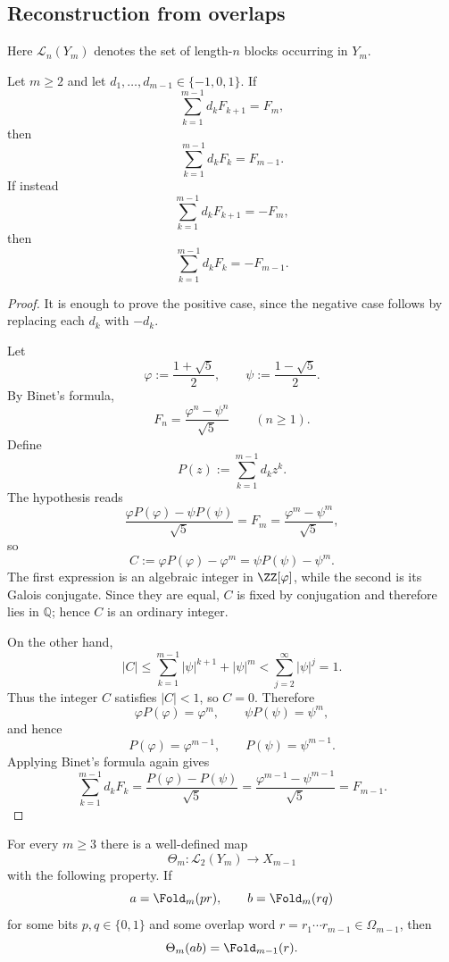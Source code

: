 \subsection{Reconstruction from overlaps}

Here $\mathcal L_n(Y_m)$ denotes the set of length-$n$ blocks occurring in
$Y_m$.

\begin{lemma}
\label{lem:signed-fibonacci-gap-shift}
Let $m\ge 2$ and let $d_1,\ldots,d_{m-1}\in\{-1,0,1\}$.  If
\[
\sum_{k=1}^{m-1} d_kF_{k+1}=F_m,
\]
then
\[
\sum_{k=1}^{m-1} d_kF_k=F_{m-1}.
\]
If instead
\[
\sum_{k=1}^{m-1} d_kF_{k+1}=-F_m,
\]
then
\[
\sum_{k=1}^{m-1} d_kF_k=-F_{m-1}.
\]
\end{lemma}

\begin{proof}
It is enough to prove the positive case, since the negative case follows by
replacing each $d_k$ with $-d_k$.

Let
\[
\varphi:=\frac{1+\sqrt5}{2},
\qquad
\psi:=\frac{1-\sqrt5}{2}.
\]
By Binet's formula,
\[
F_n=\frac{\varphi^n-\psi^n}{\sqrt5}
\qquad (n\ge 1).
\]
Define
\[
P(z):=\sum_{k=1}^{m-1} d_kz^k.
\]
The hypothesis reads
\[
\frac{\varphi P(\varphi)-\psi P(\psi)}{\sqrt5}=F_m
=
\frac{\varphi^m-\psi^m}{\sqrt5},
\]
so
\[
C:=\varphi P(\varphi)-\varphi^m
=
\psi P(\psi)-\psi^m.
\]
The first expression is an algebraic integer in $\ZZ[\varphi]$, while the
second is its Galois conjugate.  Since they are equal, $C$ is fixed by
conjugation and therefore lies in $\mathbb{Q}$; hence $C$ is an ordinary
integer.

On the other hand,
\[
|C|
\le
\sum_{k=1}^{m-1} |\psi|^{k+1}+|\psi|^m
<
\sum_{j=2}^{\infty} |\psi|^j
=
1.
\]
Thus the integer $C$ satisfies $|C|<1$, so $C=0$.  Therefore
\[
\varphi P(\varphi)=\varphi^m,
\qquad
\psi P(\psi)=\psi^m,
\]
and hence
\[
P(\varphi)=\varphi^{m-1},
\qquad
P(\psi)=\psi^{m-1}.
\]
Applying Binet's formula again gives
\[
\sum_{k=1}^{m-1} d_kF_k
=
\frac{P(\varphi)-P(\psi)}{\sqrt5}
=
\frac{\varphi^{m-1}-\psi^{m-1}}{\sqrt5}
=
F_{m-1}.
\]
\end{proof}

\begin{proposition}
\label{prop:pair-overlap-reduction}
For every $m\ge 3$ there is a well-defined map
\[
\Theta_m:\mathcal L_2(Y_m)\to X_{m-1}
\]
with the following property.  If
\[
a=\Fold_m(pr),
\qquad
b=\Fold_m(rq)
\]
for some bits $p,q\in\{0,1\}$ and some overlap word
$r=r_1\cdots r_{m-1}\in\Omega_{m-1}$, then
\[
\Theta_m(ab)=\Fold_{m-1}(r).
\]
\end{proposition}

